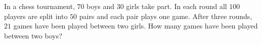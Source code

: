 In a chess tournament, $70$ boys and $30$ girls take part. In each round all $100$ players are split into $50$ pairs and each pair plays one game. After three rounds, $21$ games have been played between two girls. How many games have been played between two boys?
